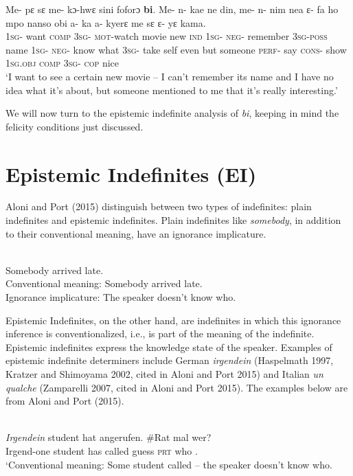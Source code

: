 \documentclass[output=paper,modfonts]{langsci/langscibook}
\begin{document}
\ex\label{ex20a}
\gll Me- pε sε me- kɔ-hwε sini foforɔ \textbf{bi}. Me- n- kae ne din, me- n- nim nea ε- fa ho mpo nanso obi a- ka a- kyerε me sε ε- yε kama.\\
\textsc{1sg}- want \textsc{comp} \textsc{3sg}- \textsc{mot}-watch movie new \textsc{ind} \textsc{1sg}- \textsc{neg}- remember \textsc{3sg}-\textsc{poss} name \textsc{1sg}- \textsc{neg}- know what \textsc{3sg}- take self even but someone \textsc{perf}- say \textsc{cons}- show \textsc{1sg}.\textsc{obj} \textsc{comp} \textsc{3sg}- \textsc{cop} nice\\
\glt `I want to see a certain new movie – I can’t remember its name and I have no idea what it’s about, but someone mentioned to me that it’s really interesting.'
\z\z

We will now turn to the epistemic indefinite analysis of \emph{bi}, keeping in mind the felicity conditions just discussed.

\section{Epistemic Indefinites (EI)}

Aloni and Port (2015) distinguish between two types of indefinites: plain indefinites and epistemic indefinites. Plain indefinites like \emph{somebody}, in addition to their conventional meaning, have an ignorance implicature.

\ea
\ea\label{ex25}\\
 Somebody arrived late.\\
\ea Conventional meaning: Somebody arrived late.\\
\ex Ignorance implicature: The speaker doesn't know who.
\z \z\z


Epistemic Indefinites, on the other hand, are indefinites in which this ignorance inference is conventionalized, i.e., is part of the meaning of the indefinite. Epistemic indefinites express the knowledge state of the speaker. Examples of epistemic indefinite determiners include German \emph{irgendein} (Haspelmath 1997, Kratzer and Shimoyama 2002, cited in Aloni and Port 2015) and Italian \emph{un qualche}  (Zamparelli 2007, cited in Aloni and Port 2015). The examples below are from Aloni and Port (2015).

\ea\label{ex26}\\
 \gll\emph{Irgendein} student hat angerufen. \#Rat mal wer?  \\
     Irgend-one student has called guess \textsc{prt} who .\\
\glt `Conventional meaning: Some student called – the speaker doesn’t know who.
\end{document}
